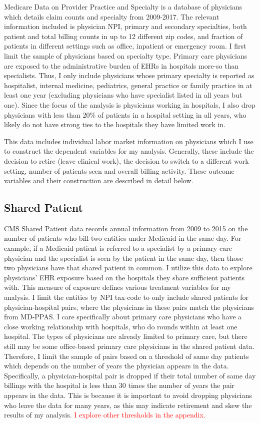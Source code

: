 \documentclass[11pt]{article}
\begin{document}
Medicare Data on Provider Practice and Specialty is a database of physicians which details claim counts and specialty from 2009-2017. The relevant information included is physician NPI, primary and secondary specialties, both patient and total billing counts in up to 12 different zip codes, and fraction of patients in different settings such as office, inpatient or emergency room. I first limit the sample of physicians based on specialty type. Primary care physicians are exposed to the administrative burden of EHRs in hospitals more-so than specialists. Thus, I only include physicians whose primary specialty is reported as hospitalist, internal medicine, pediatrics, general practice or family practice in at least one year (excluding physicians who have specialist listed in all years but one). Since the focus of the analysis is physicians working in hospitals, I also drop physicians with less than 20\% of patients in a hospital setting in all years, who likely do not have strong ties to the hospitals they have limited work in.

This data includes individual labor market information on physicians which I use to construct the dependent variables for my analysis. Generally, these include the decision to retire (leave clinical work), the decision to switch to a different work setting, number of patients seen and overall billing activity. These outcome variables and their construction are described in detail below.


\subsection{Shared Patient}

CMS Shared Patient data records annual information from 2009 to 2015 on the number of patients who bill two entities under Medicaid in the same day. For example, if a Medicaid patient is referred to a specialist by a primary care physician and the specialist is seen by the patient in the same day, then those two physicians have that shared patient in common. I utilize this data to explore physicians' EHR exposure based on the hospitals they share sufficient patients with. This measure of exposure defines various treatment variables for my analysis. I limit the entities by NPI tax-code to only include shared patients for physician-hospital pairs, where the physicians in these pairs match the physicians from MD-PPAS. I care specifically about primary care physicians who have a close working relationship with hospitals, who do rounds within at least one hospital. The types of physicians are already limited to primary care, but there still may be some office-based primary care physicians in the shared patient data. Therefore, I limit the sample of pairs based on a threshold of same day patients which depends on the number of years the physician appears in the data. Specifically, a physician-hospital pair is dropped if their total number of same day billings with the hospital is less than 30 times the number of years the pair appears in the data. This is because it is important to avoid dropping physicians who leave the data for many years, as this may indicate retirement and skew the results of my analysis. \textcolor{red}{I explore other thresholds in the appendix.} 
\end{document}
